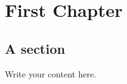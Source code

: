 \documentclass[11pt,a4paper]{report}
\begin{document}
\utadtitlepage       %
\utadcontents        %

\chapter{First Chapter}
\section{A section}
Write your content here.

%
\end{document}
